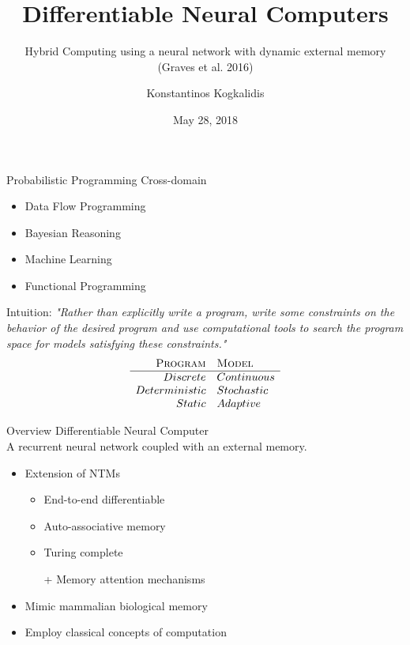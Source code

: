 \documentclass{beamer}
\title{Differentiable Neural Computers}
\subtitle{Hybrid Computing using a neural network with dynamic external memory (Graves et al. 2016)}
\author{Konstantinos Kogkalidis}
\date{May 28, 2018}
\institute{Logic and Computation}
\begin{document}
	\maketitle
	
\begin{frame}{Probabilistic Programming}
	Cross-domain
	\begin{itemize}
	\item Data Flow Programming
	\item Bayesian Reasoning
	\item Machine Learning
	\item Functional Programming
	\end{itemize}
	\pause
	Intuition:
	\textit{"Rather than explicitly write a program, write some \alert{constraints} on the behavior of the desired program and use computational tools to search the program space for \alert{models} satisfying these constraints."}
	\pause
	\[\begin{array}{rl}
	\textsc{Program} & \textsc{Model}\\
	\hline
	Discrete & Continuous\\
	Deterministic & Stochastic\\
	Static & Adaptive\\
	\end{array}\]
\end{frame}

\begin{frame}{Overview}
	\alert{Differentiable Neural Computer}\\
	A recurrent neural network coupled with an external memory.
	
	\pause
	\begin{itemize}
	\item Extension of NTMs
	\begin{itemize}
		\pause
		\item End-to-end differentiable
		\pause
		\item Auto-associative memory
		\pause
		\item Turing complete
		\pause
		\item[+] Memory attention mechanisms
		\end{itemize}
	\pause
	\item Mimic mammalian biological memory
	\item Employ classical concepts of computation
	\end{itemize}
\end{frame}
\end{document}
